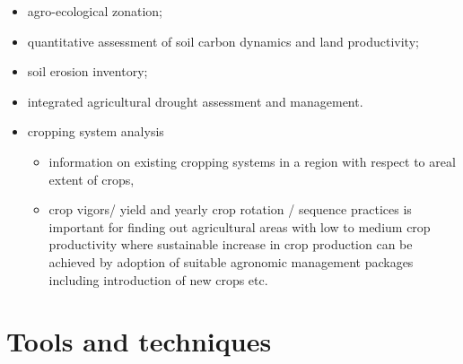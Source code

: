 \documentclass[11pt,dvipsnames,ignorenonframetext,aspectratio=169]{beamer}
\providecommand{\tightlist}{%
  \setlength{\itemsep}{0pt}\setlength{\parskip}{0pt}}
\begin{document}
\begin{frame}{}
\protect\hypertarget{section-2}{}
\begin{itemize}
\tightlist
\item
  agro-ecological zonation;
\item
  quantitative assessment of soil carbon dynamics and land productivity;
\item
  soil erosion inventory;
\item
  integrated agricultural drought assessment and management.
\item
  cropping system analysis

  \begin{itemize}
  \tightlist
  \item
    information on existing cropping systems in a region with respect to
    areal extent of crops,
  \item
    crop vigors/ yield and yearly crop rotation / sequence practices is
    important for finding out agricultural areas with low to medium crop
    productivity where sustainable increase in crop production can be
    achieved by adoption of suitable agronomic management packages
    including introduction of new crops etc.
  \end{itemize}
\end{itemize}
\end{frame}

\hypertarget{tools-and-techniques}{%
\section{Tools and techniques}\label{tools-and-techniques}}
\end{document}
